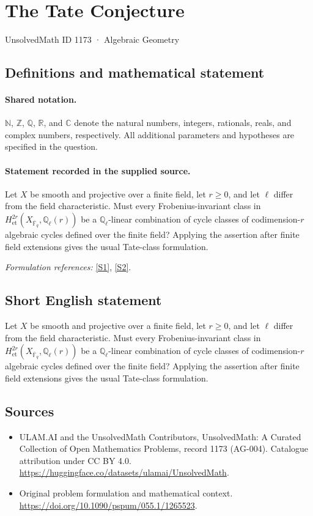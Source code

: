\documentclass[11pt]{article}
\newcommand{\sref}[2]{\hyperlink{source:#1:#2}{[S#2]}}
\begin{document}
\setcounter{section}{1172}
\section{The Tate Conjecture}\label{1173}
{\small UnsolvedMath ID 1173 · Algebraic Geometry}
\subsection{Definitions and mathematical statement}

\paragraph{Shared notation.}$\mathbb N$, $\mathbb Z$, $\mathbb Q$, $\mathbb R$, and $\mathbb C$ denote the natural numbers, integers, rationals, reals, and complex numbers, respectively. All additional parameters and hypotheses are specified in the question.


\paragraph{Statement recorded in the supplied source.}
Let $X$ be smooth and projective over a finite field, let $r\geq0$, and let $\ell$ differ from the field characteristic. Must every Frobenius-invariant class in $H^{2r}_{\mathrm{et}}(X_{\overline{\mathbb F}_q},\mathbb Q_\ell(r))$ be a $\mathbb Q_\ell$-linear combination of cycle classes of codimension-$r$ algebraic cycles defined over the finite field? Applying the assertion after finite field extensions gives the usual Tate-class formulation.
\par\smallskip\textit{Formulation references:} \sref{1173}{1}, \sref{1173}{2}.
\subsection{Short English statement}
Let $X$ be smooth and projective over a finite field, let $r\geq0$, and let $\ell$ differ from the field characteristic. Must every Frobenius-invariant class in $H^{2r}_{\mathrm{et}}(X_{\overline{\mathbb F}_q},\mathbb Q_\ell(r))$ be a $\mathbb Q_\ell$-linear combination of cycle classes of codimension-$r$ algebraic cycles defined over the finite field? Applying the assertion after finite field extensions gives the usual Tate-class formulation.
\subsection{Sources}
\begin{itemize}
\item[\hypertarget{source:1173:1}{S1}] ULAM.AI and the UnsolvedMath Contributors, UnsolvedMath: A Curated Collection of Open Mathematics Problems, record 1173 (AG-004). Catalogue attribution under CC BY 4.0.
\url{https://huggingface.co/datasets/ulamai/UnsolvedMath}.
\item[\hypertarget{source:1173:2}{S2}] Original problem formulation and mathematical context.
\url{https://doi.org/10.1090/pspum/055.1/1265523}.
\end{itemize}
\label{end:1173}
\end{document}
